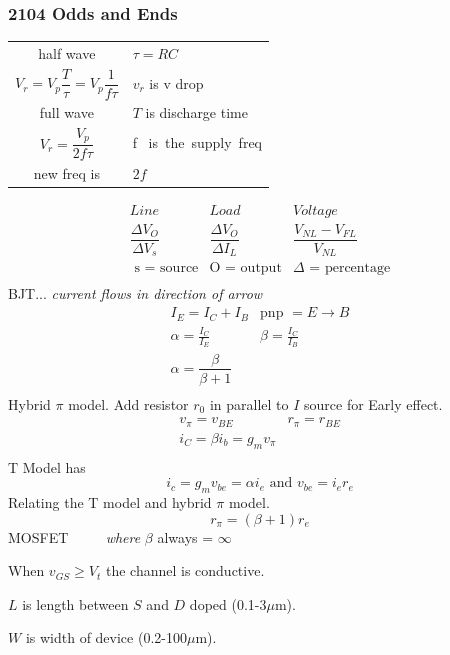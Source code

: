 \documentclass[a4paper,12pt]{article}
\begin{document}
\begin{multicols}{2}
\subsubsection*{2104 Odds and Ends}

\begin{tabular}{cl}
half wave&$\tau= RC$\\
$V_r = V_p \dfrac{T}{\tau} = V_p\dfrac{1}{f\tau }$&$v_r$ is v drop\\
full wave&$T$ is discharge time\\
$V_r = \dfrac{V_p}{2f\tau }$&f \mbox{ is the supply freq}\\
new freq is&$2f$\\
\end{tabular}

\vfill

\[
\begin{array}{ccc}
Line    &   Load    &   Voltage\\
\dfrac{\Delta V_O}{ \Delta V_s} &\dfrac{\Delta V_O }{\Delta I_L }&\dfrac{V_{NL}
- V_{FL}}{V_{NL}}\\

\mbox{ s = source} & \mbox{O = output}&\Delta \mbox{ = percentage}\\
\end{array}
\]
\vfill
BJT... \emph{current flows in direction of arrow}
\[ 
\begin{array}{cc}
I_E = I_C + I_B&\mbox{pnp }=  E \rightarrow B\\
\alpha = \frac{I_C}{I_E}& \beta = \frac{I_C}{I_B}\\
\alpha = \dfrac{\beta}{\beta + 1}&\\
\end{array}
\]
\vfill
Hybrid $\pi$ model. Add resistor $r_0$ in parallel to $I$ source for Early effect.
\[ 
\begin{array}{cc}
v_\pi = v_{BE}&r_\pi = r_{BE}\\
i_{C} = \beta i_b = g_m v_\pi&\\
\end{array}
\]
T Model has 
\[i_c = g_m v_{be} = \alpha i_e \mbox{ and }v_{be} = i_e r_e\]
Relating the T model and hybrid $\pi$ model.
\[ r_\pi = (\beta + 1 )r_e\]
MOSFET \ \ \ \ \emph{ where} $\beta$ always = $\infty$
\medskip

When $v_{GS} \ge V_t$ the channel is conductive. 
\smallskip

$L$ is length between $S$ and $D$ doped (0.1-3$\mu$m). 
\smallskip

$W$ is width of device (0.2-100$\mu$m).
\smallskip


\end{multicols}
\end{document}
